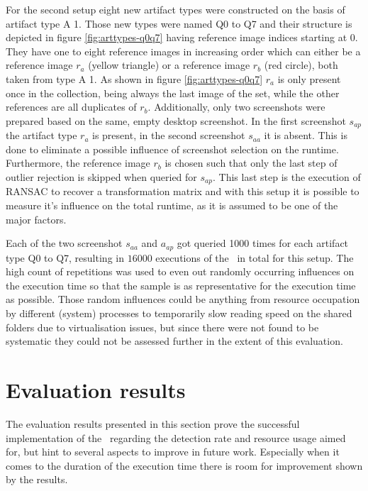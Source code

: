 For the second setup eight new artifact types were constructed on the basis of artifact type A 1. Those new types were named Q0 to Q7 and their structure is depicted in figure \ref{fig:arttypes-q0q7} having reference image indices starting at 0. They have one to eight reference images in increasing order which can either be a reference image $r_a$ (yellow triangle) or a reference image $r_b$ (red circle), both taken from type A 1. As shown in figure \ref{fig:arttypes-q0q7} $r_a$ is only present once in the collection, being always the last image of the set, while the other references are all duplicates of $r_b$. Additionally, only two screenshots were prepared based on the same, empty desktop screenshot. In the first screenshot $s_{ap}$ the artifact type $r_a$ is present, in the second screenshot $s_{aa}$ it is absent. This is done to eliminate a possible influence of screenshot selection on the runtime. Furthermore, the reference image $r_b$ is chosen such that only the last step of outlier rejection is skipped when queried for $s_{ap}$. This last step is the execution of RANSAC to recover a transformation matrix and with this setup it is possible to measure it's influence on the total runtime, as it is assumed to be one of the major factors.

Each of the two screenshot $s_{aa}$ and $a_{ap}$ got queried 1000 times for each artifact type Q0 to Q7, resulting in $16000$ executions of the \vd~in total for this setup. The high count of repetitions was used to even out randomly occurring influences on the execution time so that the sample is as representative for the execution time as possible. Those random influences could be anything from resource occupation by different (system) processes to temporarily slow reading speed on the shared folders due to virtualisation issues, but since there were not found to be systematic they could not be assessed further in the extent of this evaluation.

\section{Evaluation results}\label{sec:eval-results}

The evaluation results presented in this section prove the successful implementation of the \vd~regarding the detection rate and resource usage aimed for, but hint to several aspects to improve in future work. Especially when it comes to the duration of the execution time there is room for improvement shown by the results.

